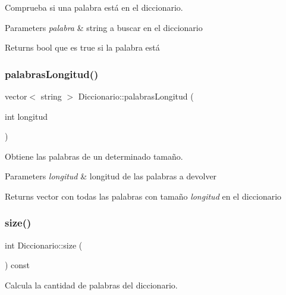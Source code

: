 Comprueba si una palabra está en el diccionario. 


\begin{DoxyParams}{Parameters}
{\em palabra} & string a buscar en el diccionario \\
\hline
\end{DoxyParams}
\begin{DoxyReturn}{Returns}
bool que es true si la palabra está 
\end{DoxyReturn}
\mbox{\label{classDiccionario_a11bd184b32340347d6757925fafdfc14}} 
\subsubsection{\texorpdfstring{palabrasLongitud()}{palabrasLongitud()}}
{\footnotesize\ttfamily vector$<$ string $>$ Diccionario\+::palabras\+Longitud (\begin{DoxyParamCaption}\item[{int}]{longitud }\end{DoxyParamCaption})}



Obtiene las palabras de un determinado tamaño. 


\begin{DoxyParams}{Parameters}
{\em longitud} & longitud de las palabras a devolver \\
\hline
\end{DoxyParams}
\begin{DoxyReturn}{Returns}
vector con todas las palabras con tamaño {\itshape longitud} en el diccionario 
\end{DoxyReturn}
\mbox{\label{classDiccionario_a74ea14ecba52288b84ffc6ea1f2fba99}} 
\subsubsection{\texorpdfstring{size()}{size()}}
{\footnotesize\ttfamily int Diccionario\+::size (\begin{DoxyParamCaption}{ }\end{DoxyParamCaption}) const}



Calcula la cantidad de palabras del diccionario. 

